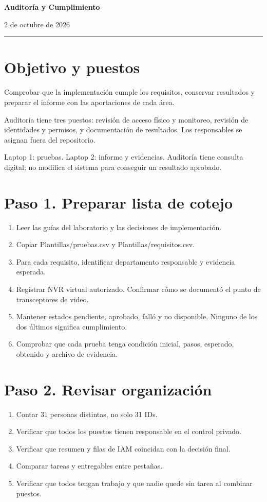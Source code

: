 \documentclass[12pt,a4paper]{article}
\begin{document}
{\LARGE\bfseries Auditoría y Cumplimiento\par}\vspace{6pt}
2 de octubre de 2026\par\hrule\vspace{10pt}
\section*{Objetivo y puestos}
Comprobar que la implementación cumple los requisitos, conservar resultados y preparar el informe con las aportaciones de cada área.\par
Auditoría tiene tres puestos: revisión de acceso físico y monitoreo, revisión de identidades y permisos, y documentación de resultados. Los responsables se asignan fuera del repositorio.\par
Laptop 1: pruebas. Laptop 2: informe y evidencias. Auditoría tiene consulta digital; no modifica el sistema para conseguir un resultado aprobado.\par
{}\section*{Paso 1. Preparar lista de cotejo}
\begin{enumerate}
\item Leer las guías del laboratorio y las decisiones de implementación.
\item Copiar \textnormal{Plantillas/\allowbreak{}pruebas.csv} y \textnormal{Plantillas/\allowbreak{}requisitos.csv}.
\item Para cada requisito, identificar departamento responsable y evidencia esperada.
\item Registrar NVR virtual autorizado. Confirmar cómo se documentó el punto de transceptores de video.
\item Mantener estados pendiente, aprobado, falló y no disponible. Ninguno de los dos últimos significa cumplimiento.
\item Comprobar que cada prueba tenga condición inicial, pasos, esperado, obtenido y archivo de evidencia.
\end{enumerate}
\section*{Paso 2. Revisar organización}
\begin{enumerate}
\item Contar 31 personas distintas, no solo 31 IDs.
\item Verificar que todos los puestos tienen responsable en el control privado.
\item Verificar que resumen y filas de IAM coincidan con la decisión final.
\item Comparar tareas y entregables entre pestañas.
\item Verificar que todos tengan trabajo y que nadie quede sin tarea al combinar puestos.
\end{enumerate}
\end{document}
